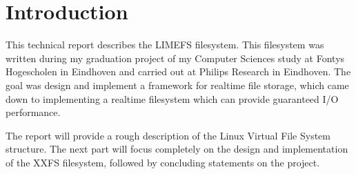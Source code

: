 \chapter{Introduction}

This technical report describes the LIMEFS filesystem. This filesystem was written during my graduation project of my Computer Sciences study at Fontys Hogescholen in Eindhoven and carried out at Philips Research in Eindhoven. The goal was design and implement a framework for realtime file storage, which came down to implementing a realtime filesystem which can provide guaranteed I/O performance.

The report will provide a rough description of the Linux Virtual File System structure. The next part will focus completely on the design and implementation of the XXFS filesystem, followed by concluding statements on the project.
